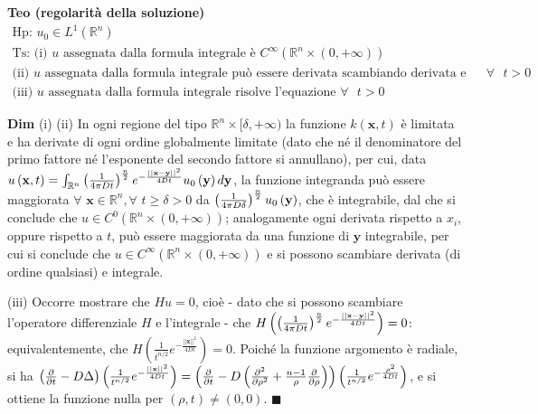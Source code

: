 \documentclass{article}
\begin{document}
\textbf{Teo (regolarit\`{a} della soluzione)}%
\begin{gather*}
\text{Hp: }u_{0}\in L^{1}\left( 
\mathbb{R}
^{n}\right) \\
\text{Ts: (i) }u\text{ assegnata dalla formula integrale \`{e} }C^{\infty
}\left( 
\mathbb{R}
^{n}\times \left( 0,+\infty \right) \right) \\
\text{(ii) }u\text{ assegnata dalla formula integrale pu\`{o} essere
derivata scambiando derivata e integrale }\forall \text{ }t>0 \\
\text{(iii) }u\text{ assegnata dalla formula integrale risolve l'equazione }%
\forall \text{ }t>0
\end{gather*}

\textbf{Dim} (i) (ii) In ogni regione del tipo $%
\mathbb{R}
^{n}\times \lbrack \delta ,+\infty )$ la funzione $k\left( \mathbf{x}%
,t\right) $ \`{e} limitata e ha derivate di ogni ordine globalmente limitate
(dato che n\'{e} il denominatore del primo fattore n\'{e} l'esponente del
secondo fattore si annullano), per cui, data $u\left( \mathbf{x},t\right)
=\int_{%
\mathbb{R}
^{n}}\left( \frac{1}{4\pi Dt}\right) ^{\frac{n}{2}}e^{-\frac{\left\vert
\left\vert \mathbf{x-y}\right\vert \right\vert ^{2}}{4Dt}}u_{0}\left( 
\mathbf{y}\right) d\mathbf{y}$, la funzione integranda pu\`{o} essere
maggiorata $\forall $ $\mathbf{x}\in 
\mathbb{R}
^{n},\forall $ $t\geq \delta >0$ da $\left( \frac{1}{4\pi D\delta }\right) ^{%
\frac{n}{2}}u_{0}\left( \mathbf{y}\right) $, che \`{e} integrabile, dal che
si conclude che $u\in C^{0}\left( 
\mathbb{R}
^{n}\times \left( 0,+\infty \right) \right) $; analogamente ogni derivata
rispetto a $x_{i}$, oppure rispetto a $t$, pu\`{o} essere maggiorata da una
funzione di $\mathbf{y}$ integrabile, per cui si conclude che $u\in
C^{\infty }\left( 
\mathbb{R}
^{n}\times \left( 0,+\infty \right) \right) $ e si possono scambiare
derivata (di ordine qualsiasi) e integrale.

(iii) Occorre mostrare che $Hu=0$, cio\`{e} - dato che si possono scambiare
l'operatore differenziale $H$ e l'integrale - che $H\left( \left( \frac{1}{%
4\pi Dt}\right) ^{\frac{n}{2}}e^{-\frac{\left\vert \left\vert \mathbf{x-y}%
\right\vert \right\vert ^{2}}{4Dt}}\right) =0$: equivalentemente, che $%
H\left( \frac{1}{t^{n/2}}e^{-\frac{\left\vert \left\vert \mathbf{x}%
\right\vert \right\vert ^{2}}{4Dt}}\right) =0$. Poich\'{e} la funzione
argomento \`{e} radiale, si ha $\left( \frac{\partial }{\partial t}-D\Delta
\right) \left( \frac{1}{t^{n/2}}e^{-\frac{\left\vert \left\vert \mathbf{x}%
\right\vert \right\vert ^{2}}{4Dt}}\right) =\left( \frac{\partial }{\partial
t}-D\left( \frac{\partial ^{2}}{\partial \rho ^{2}}+\frac{n-1}{\rho }\frac{%
\partial }{\partial \rho }\right) \right) \left( \frac{1}{t^{n/2}}e^{-\frac{%
\rho ^{2}}{4Dt}}\right) $, e si ottiene la funzione nulla per $\left( \rho
,t\right) \neq \left( 0,0\right) $. $\blacksquare $
\end{document}
